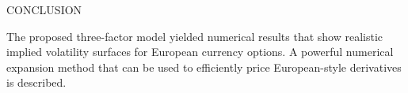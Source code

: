 \documentclass[unknownkeysallowed, compress]{beamer}
\theoremstyle{plain}
\begin{document}
\begin{frame}[allowframebreaks]{CONCLUSION}
\par The proposed three-factor model yielded numerical results that show realistic implied volatility surfaces for European currency options. A powerful numerical expansion method that can be used to efficiently price European-style derivatives is described.




%
%
%
%
%
%
%
%
%
%
%
%
%
%
%
%
%
%
%
%
%
%
%
%
%
%
%


\end{frame}

\end{document}
